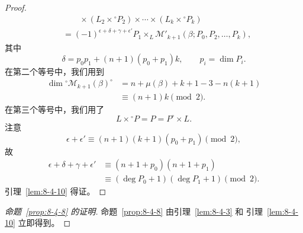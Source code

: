 \begin{proof}
\[\begin{aligned}
 &\qquad{}\times(L_2\times{}^\circ P_2)\times\cdots
 \times(L_k\times{}^\circ P_k)\\
 &=(-1)^{\epsilon+\delta+\gamma+\epsilon'}
 P_1\times_L\mathcal M'_{k+1}(\beta;P_0,P_2,\ldots,P_k),
\end{aligned}
\]
其中
\[
 \delta=p_0p_1+(n+1)(p_0+p_1)k,
 \qquad p_i=\dim P_i.
\]
在第二个等号中，我们用到
\[
\begin{aligned}
 \dim{}^\circ\mathcal M_{k+1}(\beta)^\circ
 &=n+\mu(\beta)+k+1-3-n(k+1)\\
 &\equiv(n+1)k\pmod2.
\end{aligned}
\]
在第三个等号中，我们用了
\[
 L\times{}^\circ P=P=P^\circ\times L.
\]
注意
\[
 \epsilon+\epsilon'
 \equiv(n+1)(k+1)(p_0+p_1)\pmod2,
\]
故
\[
\begin{aligned}
 \epsilon+\delta+\gamma+\epsilon'
 &\equiv(n+1+p_0)(n+1+p_1)\\
 &\equiv(\deg P_0+1)(\deg P_1+1)\pmod2.
\end{aligned}
\]
引理~\ref{lem:8-4-10} 得证。
\end{proof}

\begin{proof}[命题~\ref{prop:8-4-8} 的证明]
命题~\ref{prop:8-4-8} 由引理~\ref{lem:8-4-3} 和
引理~\ref{lem:8-4-10} 立即得到。
\end{proof}

